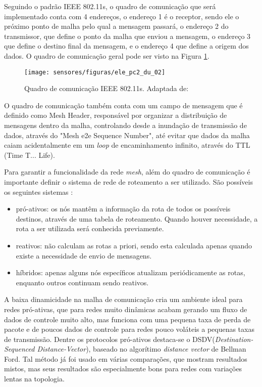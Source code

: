 Seguindo o padrão IEEE 802.11s, o quadro de comunicação que será implementado conta com 4 endereços, o endereço 1 é o receptor, sendo ele o próximo ponto de malha pelo qual a mensagem passará, o endereço 2 do transmissor, que define o ponto da malha que enviou a mensagem, o endereço 3 que define o destino final da mensagem, e o endereço 4 que define a origem dos dados. O quadro de comunicação geral pode ser visto na Figura \ref{ele_pc2_du_02}.

\begin{figure}
\centering
\texttt{[image: sensores/figuras/ele\_pc2\_du\_02]}
\caption{Quadro de comunicação IEEE 802.11s. Adaptada de:\cite{bib_ele_du_2}}
\label{ele_pc2_du_02}
\end{figure}

O quadro de comunicação também conta com um campo de mensagem que é definido como Mesh Header, responsável por organizar a distribuição de mensagens dentro da malha, controlando desde a inundação de transmissão de dados, através do "Mesh e2e Sequence Number", até evitar que dados da malha caiam acidentalmente em um \emph{loop} de encaminhamento infinito, através do TTL (Time T... Life).

Para garantir a funcionalidade da rede \emph{mesh}, além do quadro de comunicação é importante definir o sistema de rede de roteamento a ser utilizado. São possíveis os seguintes sistemas \cite{bib_ele_du_3}:

\begin{itemize}
	\item pró-ativos: os nós mantêm a informação da rota de todos os possíveis destinos, através de uma tabela de roteamento. Quando houver necessidade, a rota a ser utilizada será conhecida previamente.
	\item reativos:  não calculam as rotas a priori, sendo esta calculada apenas quando existe a necessidade de envio de mensagens.
	\item híbridos:  apenas alguns nós específicos atualizam periódicamente as rotas, enquanto outros continuam sendo reativos.
\end{itemize}

A baixa dinamicidade na malha de comunicação cria um ambiente ideal para redes pró-ativas, que para redes muito dinâmicas acabam gerando um fluxo de dados de controle muito alto, mas funciona com uma pequena taxa de perda de pacote e de poucos dados de controle para redes pouco voláteis a pequenas taxas de transmissão. Dentre os protocolos pró-ativos destaca-se o DSDV(\emph{Destination-Sequenced Distance-Vector}), baseado no algorítimo \emph{distance vector} de Bellman Ford. Tal método já foi usado em várias comparações, que mostram resultados mistos, mas seus resultados são especialmente bons para redes com variações lentas na topologia.\cite{bib_ele_du_6}

